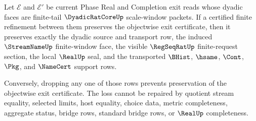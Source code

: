 \begin{theorem}
\label{thm:dyadicratcore-finite-tail-refinement-support-necessity}
Let $\mathcal E$ and $\mathcal E'$ be current Phase Real and Completion exit reads whose dyadic faces are finite-tail $\DyadicRatCoreUp$ scale-window packets. If a certified finite refinement between them preserves the objectwise exit certificate, then it preserves exactly the dyadic source and transport row, the induced $\StreamNameUp$ finite-window face, the visible $\RegSeqRatUp$ finite-request section, the local $\RealUp$ seal, and the transported $\BHist$, $\hsame$, $\Cont$, $\Pkg$, and $\NameCert$ support rows.

Conversely, dropping any one of those rows prevents preservation of the objectwise exit certificate. The loss cannot be repaired by quotient stream equality, selected limits, host equality, choice data, metric completeness, aggregate status, bridge rows, standard bridge rows, or $\RealUp$ completeness.
\end{theorem}
